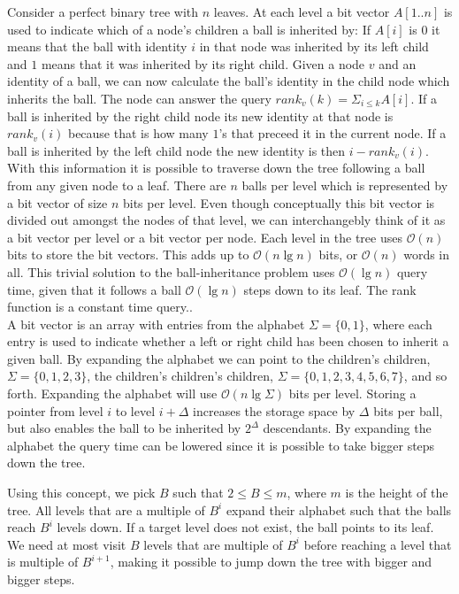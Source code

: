 Consider a perfect binary tree with $n$ leaves. At each level a bit vector $A[1..n]$ is used to indicate which of a node's children a ball is inherited by: If $A[i]$ is $0$ it means that the ball with identity $i$ in that node was inherited by its left child and $1$ means that it was inherited by its right child. Given a node $v$ and an identity of a ball, we can now calculate the ball's identity in the child node which inherits the ball. The node can answer the query $rank_v(k) = \Sigma_{i \leq k} A[i]$. If a ball is inherited by the right child node its new identity at that node is $rank_v(i)$ because that is how many $1$'s that preceed it in the current node. If a ball is inherited by the left child node the new identity is then $i-rank_v(i)$. With this information it is possible to traverse down the tree following a ball from any given node to a leaf. There are $n$ balls per level which is represented by a bit vector of size $n$ bits per level. Even though conceptually this bit vector is divided out amongst the nodes of that level, we can interchangebly think of it as a bit vector per level or a bit vector per node. Each level in the tree uses $\mathcal{O}(n)$ bits to store the bit vectors. This adds up to $\mathcal{O}(n \lg n)$ bits, or $\mathcal{O}(n)$ words in all. This trivial solution to the ball-inheritance problem uses $\mathcal{O}(\lg n)$ query time, given that it follows a ball $\mathcal{O}(\lg n)$ steps down to its leaf. The rank function is a constant time query.. \\


A bit vector is an array with entries from the alphabet $\Sigma = \{0,1\}$, where each entry is used to indicate whether a left or right child has been chosen to inherit a given ball. By expanding the alphabet we can point to the children's children, $\Sigma = \{0,1,2,3\}$, the children's children's children, $\Sigma = \{0,1,2,3,4,5,6,7\}$, and so forth. Expanding the alphabet will use $\mathcal{O}(n \lg \Sigma)$ bits per level. Storing a pointer from level $i$ to level $i+\Delta$ increases the storage space by $\Delta$ bits per ball, but also enables the ball to be inherited by $2^\Delta$ descendants. By expanding the alphabet the query time can be lowered since it is possible to take bigger steps down the tree. 

Using this concept, we pick $B$ such that $2 \leq B \leq m$, where $m$ is the height of the tree. All levels that are a multiple of $B^i$ expand their alphabet such that the balls reach $B^i$ levels down. If a target level does not exist, the ball points to its leaf. We need at most visit $B$ levels that are multiple of $B^i$ before reaching a level that is multiple of $B^{i+1}$, making it possible to jump down the tree with bigger and bigger steps.

